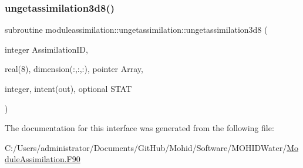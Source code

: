 \subsubsection{\texorpdfstring{ungetassimilation3d8()}{ungetassimilation3d8()}}
{\footnotesize\ttfamily subroutine moduleassimilation\+::ungetassimilation\+::ungetassimilation3d8 (\begin{DoxyParamCaption}\item[{integer}]{Assimilation\+ID,  }\item[{real(8), dimension(\+:,\+:,\+:), pointer}]{Array,  }\item[{integer, intent(out), optional}]{S\+T\+AT }\end{DoxyParamCaption})\hspace{0.3cm}{\ttfamily [private]}}



The documentation for this interface was generated from the following file\+:\begin{DoxyCompactItemize}
\item 
C\+:/\+Users/administrator/\+Documents/\+Git\+Hub/\+Mohid/\+Software/\+M\+O\+H\+I\+D\+Water/\mbox{\hyperlink{_module_assimilation_8_f90}{Module\+Assimilation.\+F90}}\end{DoxyCompactItemize}
